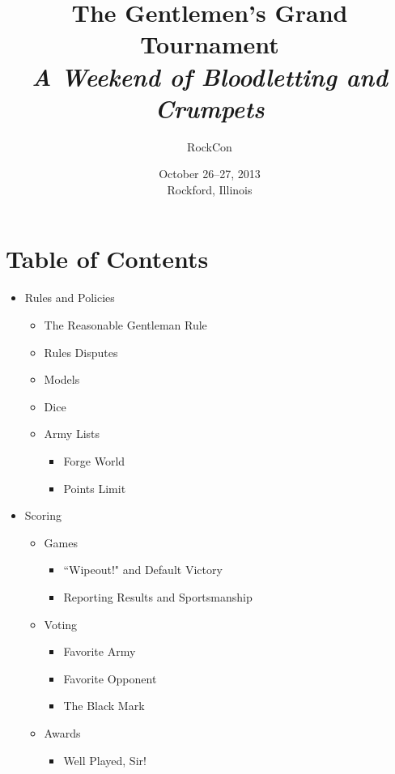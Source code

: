 \documentclass[10pt,titlepage]{article}
\begin{document}
\begin{titlepage}
\title{The Gentlemen's Grand Tournament\\{\large\textit{A Weekend of Bloodletting and Crumpets}}}
\author{RockCon}
\date{October 26--27, 2013\\Rockford, Illinois}
\maketitle
\end{titlepage}

\section*{Table of Contents}

\begin{itemize}
\item Rules and Policies
  \begin{itemize}
  \item The Reasonable Gentleman Rule
  \item Rules Disputes
  \item Models
  \item Dice
  \item Army Lists
    \begin{itemize}
    \item Forge World
    \item Points Limit
    \end{itemize}
  \end{itemize}
\item Scoring
  \begin{itemize}
  \item Games
    \begin{itemize}
    \item ``Wipeout!" and Default Victory
    \item Reporting Results and Sportsmanship
    \end{itemize}
  \item Voting
    \begin{itemize}
    \item Favorite Army
    \item Favorite Opponent
    \item The Black Mark
    \end{itemize}
  \item Awards
    \begin{itemize}
    \item Well Played, Sir!

\end{itemize}
\end{itemize}
\end{itemize}
\end{document}
